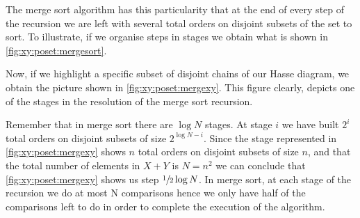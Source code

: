 The merge sort algorithm has this particularity that at the end of every step
of the recursion we are left with several total orders on disjoint subsets of
the set to sort. To illustrate, if we organise steps in stages we obtain what
is shown in \ref{fig:xy:poset:mergesort}.

Now, if we highlight a specific subset of disjoint chains of our Hasse diagram,
we obtain the picture shown in \ref{fig:xy:poset:mergexy}. This figure
clearly, depicts one of the stages in the resolution of the merge sort recursion.

Remember that in merge sort there are $\log N$ stages. At stage $i$ we have
built $2^{i}$ total orders on disjoint subsets of size $2^{\log N - i}$. Since
the stage represented in \ref{fig:xy:poset:mergexy} shows $n$ total orders on
disjoint subsets of size $n$, and that the total number of elements in $X+Y$ is
$N = n^2$ we can conclude that \ref{fig:xy:poset:mergexy} shows us step
$\sfrac{1}{2} \log N$. In merge sort, at each stage of the recursion we do at
most N comparisons hence we only have half of the comparisons left to do in
order to complete the execution of the algorithm.


